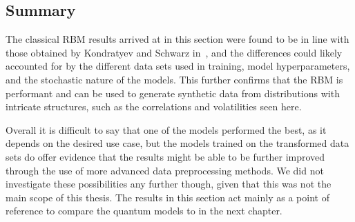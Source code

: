 \subsection{Summary}
The classical RBM results arrived at in this section were found to be in line with those obtained by Kondratyev and Schwarz in~\cite{kondratyev_2019}, and the differences could likely accounted for by the different data sets used in training, model hyperparameters, and the stochastic nature of the models.
This further confirms that the RBM is performant and can be used to generate synthetic data from distributions with intricate structures, such as the correlations and volatilities seen here.

Overall it is difficult to say that one of the models performed the best, as it depends on the desired use case, but the models trained on the transformed data sets do offer evidence that the results might be able to be further improved through the use of more advanced data preprocessing methods.
We did not investigate these possibilities any further though, given that this was not the main scope of this thesis.
The results in this section act mainly as a point of reference to compare the quantum models to in the next chapter.
